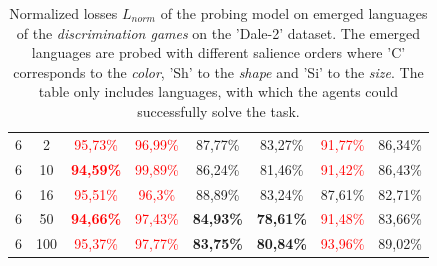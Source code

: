 \begin{table}[ht]
\begin{tabular}{cc|c|c|c|c|c|c}
        {6} & {2}   & \textcolor{red}{95,73\%}          & \textcolor{red}{96,99\%}          & {87,77\%}                & {83,27\%}                & \textcolor{red}{91,77\%} & {86,34\%}                \\
        {6} & {10}  & \textcolor{red}{\textbf{94,59\%}} & \textcolor{red}{99,89\%}          & {86,24\%}                & {81,46\%}                & \textcolor{red}{91,42\%} & {86,43\%}                \\
        {6} & {16}  & \textcolor{red}{95,51\%}          & \textcolor{red}{96,3\%}           & {88,89\%}                & {83,24\%}                & {87,61\%}                & {82,71\%}                \\
        {6} & {50}  & \textcolor{red}{\textbf{94,66\%}} & \textcolor{red}{97,43\%}          & \textbf{84,93\%}         & \textbf{78,61\%}         & \textcolor{red}{91,48\%} & {83,66\%}                \\
        {6} & {100} & \textcolor{red}{95,37\%}          & \textcolor{red}{97,77\%}          & \textbf{83,75\%}         & \textbf{80,84\%}         & \textcolor{red}{93,96\%} & {89,02\%}                \\
        \bottomrule
    \end{tabular}
    \caption{Normalized losses $L_{norm}$ of the probing model on emerged languages of the \emph{discrimination games} on the 'Dale-2' dataset. The emerged languages are probed with different salience orders where 'C' corresponds to the \emph{color}, 'Sh' to the \emph{shape} and 'Si' to the \emph{size}. The table only includes languages, with which the agents could successfully solve the task.}
    \label{tab:probing:discriminator:dale-2}
\end{table}

